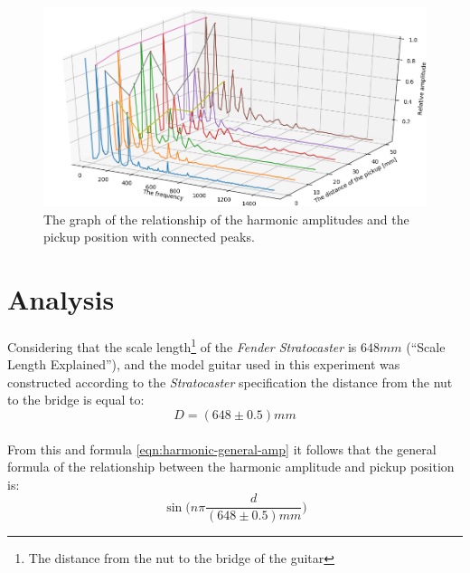 \documentclass{article}
\begin{document}
\begin{figure}[ht]
	\centering
	\includegraphics[width=\textwidth]{img/final-graph-c}
	\caption{The graph of the relationship of the harmonic amplitudes and the 
	pickup position with connected peaks.}
	\label{fig:final-graph-c}
\end{figure}

\section{Analysis}

\paragraph*{}
Considering that the scale length\footnote{The distance from the nut to the 
bridge of the guitar} of the \textit{Fender Stratocaster} is $648\si{mm}$ 
(``Scale Length Explained''), and the model guitar used in this experiment was 
constructed according to the \textit{Stratocaster} specification the distance 
from the nut to the bridge is equal to:
$$D = (648 \pm 0.5)\si{mm}$$

\paragraph*{}
From this and formula \ref{eqn:harmonic-general-amp} it follows that the
general formula of the relationship between the harmonic amplitude and pickup
position is:
$$\sin \bigg(n \pi \frac{d}{(648 \pm 0.5) \si{mm}} \bigg)$$
\end{document}
